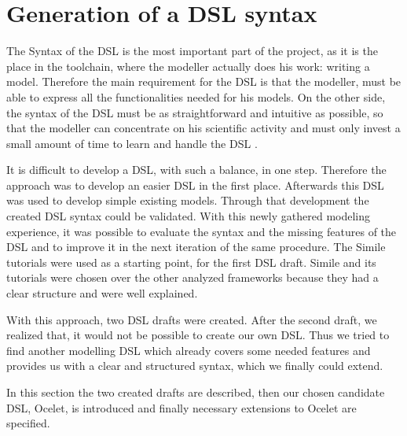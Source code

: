 \chapter{Generation of a DSL syntax} \label{chap:generation_dsl}
\par
The Syntax of the DSL is the most important part of the project, as it is the place in the toolchain, where the modeller actually does his work: writing a model. Therefore the main requirement for the DSL is that the modeller, must be able to express all the functionalities needed for his models. On the other side, the syntax of the DSL must be as straightforward and intuitive as possible, so that the modeller can concentrate on his scientific activity and must only invest a small amount of time to learn and handle the DSL \autocite{dsl:mernik}.
\par
It is difficult to develop a DSL, with such a balance, in one step. Therefore the approach was to develop an easier DSL in the first place. Afterwards this DSL was used to develop simple existing models. Through that development the created DSL syntax could be validated. With this newly gathered modeling experience, it was possible to evaluate the syntax and the missing features of the DSL and to improve it in the next iteration of the same procedure.
The Simile tutorials were used as a starting point, for the first DSL draft. Simile and its tutorials were chosen over the other analyzed frameworks because they had a clear structure and were well explained.
\par
With this approach, two DSL drafts were created. After the second draft, we realized that, it would not be possible to create our own DSL. Thus we tried to find another modelling DSL which already covers some needed features and provides us with a clear and structured syntax, which we finally could extend.
\par
In this section the two created drafts are described, then our chosen candidate DSL, Ocelet, is introduced and finally necessary extensions to Ocelet are specified.

